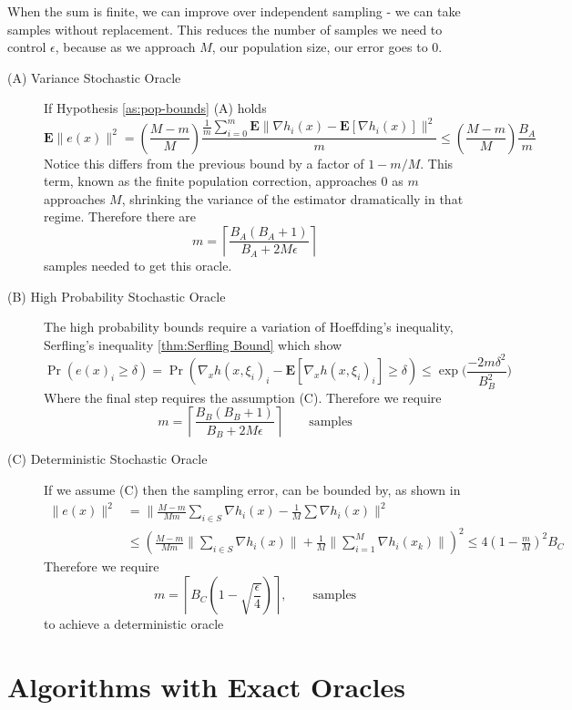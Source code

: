 When the sum is finite, we can improve over independent sampling - we can take
samples without replacement. This reduces the number of samples we need to 
control $\epsilon$, because as we approach $M$, our population size, our error
goes to $0$.
\begin{description}
\item[(A) Variance Stochastic Oracle] If Hypothesis \ref{as:pop-bounds} (A) holds $$
\mathbf{E}\|e(x)\|^{2} = 
\left(\frac{M-m}{M}\right)\frac{\frac{1}{m}
\sum_{i=0}^{m}\mathbf{E}\|\nabla h_i(x)-\mathbf{E}[\nabla h_i(x)]\|^{2}}{m} 
\leq\left(\frac{M-m}{M}\right)\frac{B_A}{m} $$ Notice this
differs from the previous bound by a factor of $1 - m/M$. This term, known as
the finite population correction, approaches $0$ as $m$ approaches $M$, shrinking
the variance of the estimator dramatically in that regime. Therefore 
there are 
$$m= \left\lceil \frac{B_A(B_A+1)}{B_A+2M\epsilon} \right\rceil $$
samples needed to get this oracle.
\item[(B) High Probability Stochastic Oracle] The high probability bounds require
a variation of Hoeffding's inequality, Serfling's inequality \ref{thm:Serfling Bound} which show
$$
\Pr\left(e(x)_i \geq\delta\right)=\Pr\left(\nabla_x h(x,\xi_{i})_i-\mathbf{E}[\nabla_x h(x,\xi_{i})_i] \geq\delta\right)\leq\exp\Big(\frac{-2m\delta^{2}}{B_B^{2}}\Big)
$$
Where the final step requires the assumption (C). Therefore we require
$$m=  \left\lceil \frac{B_B(B_B+1)}{B_B+2M\epsilon}  \right\rceil \qquad \mbox{samples}$$

\item[(C) Deterministic Stochastic Oracle] If we assume (C) then the
sampling error, can be bounded by, as shown in \cite{friedlander2012hybrid}
\begin{align*}
\|e(x)\|^{2} & =\Big\|\frac{M-m}{Mm}\sum_{i\in S}\nabla h_{i}(x)-\frac{1}{M}\sum\nabla h_{i}(x)\Big\|^{2}\\
 & \leq\left(\frac{M-m}{Mm}\Big\|\sum_{i\in S}\nabla h_{i}(x)\Big\|+\frac{1}{M}\Big\|\sum_{i=1}^{M}\nabla h_{i}(x_{k})\Big\|\right)^{2}\leq4\left(1-\frac{m}{M}\right)^{2}B_C
\end{align*}
Therefore we require
$$
m=\left\lceil B_C\left(1-\sqrt{\frac{\epsilon}{4}}\right)\right\rceil, \qquad \mbox{samples}
$$
to achieve a deterministic oracle
\end{description}


\section{Algorithms with Exact Oracles}

